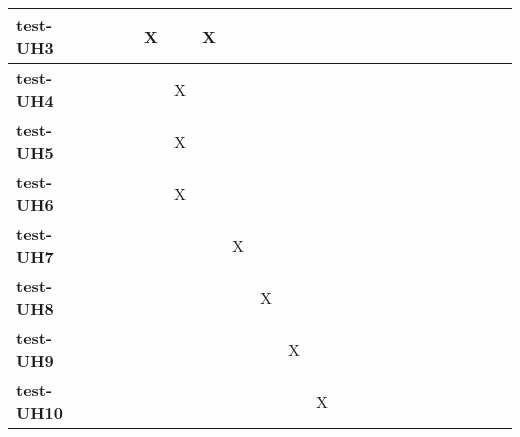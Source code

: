 \documentclass[12pt, titlepage]{article}
\begin{document}
\begin{landscape}
\begin{table}[H]
\begin{adjustwidth}{-0.3in}{-0.5in}
{\begin{tabular}{c|c|c|c|c|c|c|c|c|c|c|c|c|c|c|c|c|c|c|c|c|c|}
\multicolumn{1}{|l|}{\textbf{test-UH3}}   &             &             &             &     X        &              &     X        &             &             &              &              &              &              &             &             &             &       &  &&&&     \\ \hline
\multicolumn{1}{|l|}{\textbf{test-UH4}}   &              &              &              &              &    X          &              &             &             &             &             &             &             &              &              &            &     &  &&&&       \\ \hline
\multicolumn{1}{|l|}{\textbf{test-UH5}}   &             &             &             &             &      X       &             &             &             &              &              &              &              &             &             &             &      &   &&&&     \\ \hline
\multicolumn{1}{|l|}{\textbf{test-UH6}}   &             &             &              &             &      X       &             &             &             &              &              &              &              &             &             &             &      &  &&&&      \\ \hline
\multicolumn{1}{|l|}{\textbf{test-UH7}}   &             &             &              &             &             &           &     X        &             &              &              &              &              &             &             &             &      &  &&&&      \\ \hline
\multicolumn{1}{|l|}{\textbf{test-UH8}}   &             &             &              &             &             &           &             & X            &              &              &              &              &             &             &             &      &  &&&&      \\ \hline
\multicolumn{1}{|l|}{\textbf{test-UH9}}   &             &             &              &             &             &           &             &             &      X        &              &              &              &             &             &             &      &  &&&&      \\ \hline
\multicolumn{1}{|l|}{\textbf{test-UH10}}   &             &             &              &             &             &           &             &             &              &        X      &              &              &             &             &             &      &  &&&&      \\ \hline

\end{tabular}}
\end{adjustwidth}
\end{table}
\end{landscape}
\end{document}
